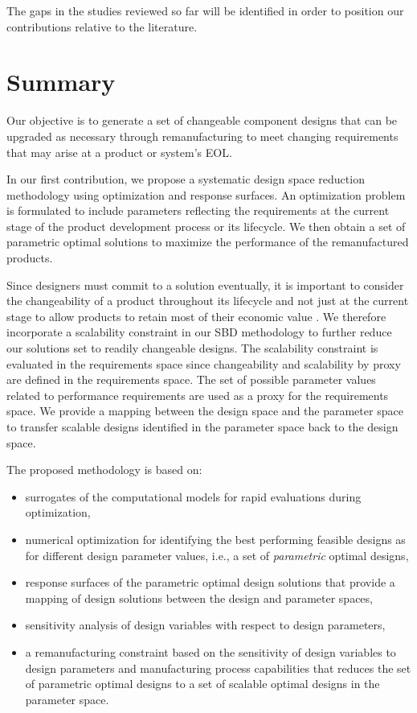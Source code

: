 The gaps in the studies reviewed so far will be identified in order to position our contributions relative to the literature.

\section{Summary}
\label{sec:bgsummary}

Our objective is to generate a set of changeable component designs that can be upgraded as necessary through remanufacturing to meet changing requirements that may arise at a product or system's \ac{EOL}. 

In our first contribution, we propose a systematic design space reduction methodology using optimization and response surfaces. An optimization problem is formulated to include parameters reflecting the requirements at the current stage of the product development process or its lifecycle. We then obtain a set of parametric optimal solutions to maximize the performance of the remanufactured products. 

Since designers must commit to a solution eventually, it is important to consider the {changeability} of a product throughout its lifecycle and not just at the current stage to allow products to retain most of their economic value \cite{Fricke2005}. We therefore incorporate a scalability constraint in our \ac{SBD} methodology to further reduce our solutions set to readily changeable designs. The scalability constraint is evaluated in the requirements space since changeability and scalability by proxy are defined in the requirements space. The set of possible parameter values related to performance requirements are used as a proxy for the requirements space. We provide a mapping between the design space and the parameter space to transfer scalable designs identified in the parameter space back to the design space.

The proposed methodology is based on:
\begin{itemize}
	\item surrogates of the computational models for rapid evaluations during optimization,
	\item numerical optimization for identifying the best performing feasible designs as for different design parameter values, i.e., a set of \textit{parametric} optimal designs,%
	\item response surfaces of the parametric optimal design solutions that provide a mapping of design solutions between the design and parameter spaces,
	\item sensitivity analysis of design variables with respect to design parameters,
	\item a remanufacturing constraint based on the sensitivity of design variables to design parameters and manufacturing process capabilities that reduces the set of parametric optimal designs to a set of {scalable} optimal designs in the parameter space.
\end{itemize}

